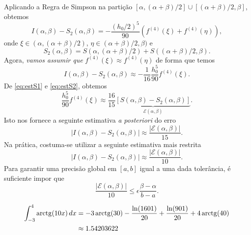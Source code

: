 Aplicando a Regra de Simpson na partição $[\alpha,(\alpha+\beta)/2]\cup [(\alpha+\beta)/2, \beta]$, obtemos
\begin{equation}
  I(\alpha,\beta) - S_2(\alpha,\beta) = -\frac{(h_0/2)^5}{90}\left(f^{(4)}(\xi) + f^{(4)}(\eta)\right),
\end{equation}
onde $\xi\in (\alpha,(\alpha+\beta)/2)$, $\eta\in (\alpha+\beta)/2, \beta)$ e
\begin{equation}
  S_2(\alpha,\beta) = S(\alpha,(\alpha+\beta)/2) + S((\alpha+\beta)/2,\beta).
\end{equation}
Agora, \emph{vamos assumir que} $f^{(4)}(\xi)\approx f^{(4)}(\eta)$ de forma que temos
\begin{equation}\label{eq:estS2}
  I(\alpha,\beta) - S_2(\alpha,\beta) \approx -\frac{1}{16}\frac{h_0^5}{90}f^{(4)}(\xi).
\end{equation}
De \eqref{eq:estS1} e \eqref{eq:estS2}, obtemos
\begin{equation}
  \frac{h_0^5}{90}f^{(4)}(\xi) \approx \frac{16}{15}\underbrace{\left[S(\alpha,\beta)-S_2(\alpha,\beta)\right]}_{\mathcal{E}(\alpha,\beta)}.
\end{equation}
Isto nos fornece a seguinte estimativa {\it a posteriori} do erro
\begin{equation}
  |I(\alpha,\beta)-S_2(\alpha,\beta)| \approx \frac{|\mathcal{E}(\alpha,\beta)|}{15}.
\end{equation}
Na prática, costuma-se utilizar a seguinte estimativa mais restrita
\begin{equation}
  |I(\alpha,\beta)-S_2(\alpha,\beta)| \approx \frac{|\mathcal{E}(\alpha,\beta)|}{10}.
\end{equation}
Para garantir uma precisão global em $[a,b]$ igual a uma dada tolerância, é suficiente impor que
\begin{equation}
  \frac{|\mathcal{E}(\alpha,\beta)|}{10} \leq \epsilon\frac{\beta-\alpha}{b-a}.
\end{equation}



\begin{ex}
  \begin{align}
    \int_{-3}^4\operatorname{arctg}(10x)\,dx &= -3\operatorname{arctg}(30) - \frac{\ln(1601)}{20} + \frac{\ln(901)}{20} + 4\operatorname{arctg}(40)\\
                               &\approx 1.54203622
  \end{align}
\end{ex}

